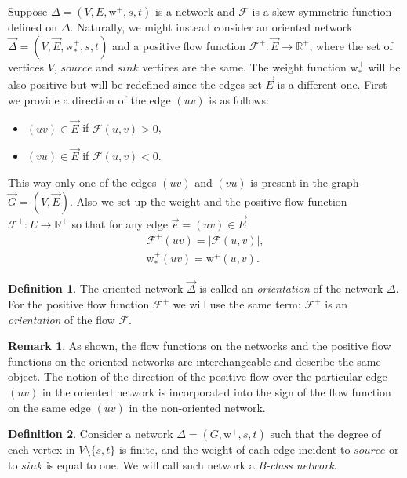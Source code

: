 \documentclass[12pt]{article}
\theoremstyle{definition}
\newtheorem{remark}{Remark}
\newtheorem{definition}{Definition}
\newcommand{\wtp}{\mathrm{w}^{+}}
\newcommand{\flow}{\mathcal{F}}
\newcommand{\flowpos}{\mathcal{F}^{+}}
\newcommand{\source}{\mathit{source}}
\newcommand{\sink}{\mathit{sink}}
\newcommand{\net}{\Delta}
\newcommand{\onet}{\vec{\Delta}}
\numberwithin{remark}{section}
\numberwithin{theorem}{section}
\numberwithin{prop}{section}
\numberwithin{equation}{section}
\numberwithin{lemma}{section}
\numberwithin{prop_under_lemma}{lemma}
\begin{document}
    Suppose $\net = (V, E, \wtp, s, t)$ is a network and $\flow$ is a skew-symmetric function defined
    on $\net$.
    Naturally, we might instead consider an oriented network $\onet = (V, \vec{E}, \wtp_{*}, s, t)$ and a 
      positive flow function $\flowpos: \vec{E} \to \mathbb{R}^{+}$, where
      the set of vertices $V$, $\source$ and $\sink$ vertices are the same.
    The weight function $\wtp_{*}$ will be also positive but will be redefined since the edges set $\vec{E}$ is a different one.
    First we provide a direction of the edge $(uv)$ is as follows:
    \begin{itemize}
      \item $(uv) \in \vec{E}$ if $\flow(u, v) > 0$,
      \item $(vu) \in \vec{E}$ if $\flow(u, v) < 0$.
    \end{itemize}
    This way only one of the edges $(uv)$ and $(vu)$ is present in the graph $\vec{G} = (V, \vec{E})$.
    Also we set up the weight and the positive flow function $\flowpos: E \to \mathbb{R}^{+}$ so that
    for any edge $\vec{e} = (uv) \in \vec{E}$
    \begin{align*}
      \flowpos(uv) = |\flow(u,v)|,\\
      \wtp_{*}(uv) = \wtp(u,v).
    \end{align*}
    \begin{definition}
      The oriented network $\onet$ is called an \emph{orientation} of the network $\net$.
      For the positive flow function $\flowpos$ we will use the same term:
        $\flowpos$ is an \emph{orientation} of the flow $\flow$.
    \end{definition}
    \begin{remark}
      As shown, the flow functions on the networks and the positive flow functions on the oriented networks
        are interchangeable and describe the same object.
      The notion of the direction of the positive flow over the particular edge $(uv)$ in the oriented network
        is incorporated into the sign of the flow function on the same edge $(uv)$ in the non-oriented network.
    \end{remark}
    \begin{definition}
      Consider a network $\net = (G, \wtp, s, t)$ such that
        the degree of each vertex in $V \setminus \{s, t\} $ is finite,
        and the weight of each edge incident to $\source$ or to $\sink$ is equal to one.
      We will call such network a \emph{B-class network}.
    \end{definition}
    
\end{document}
